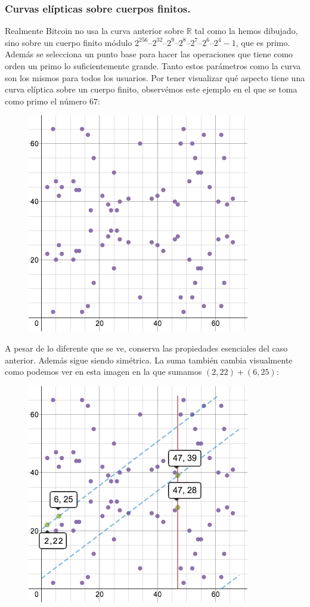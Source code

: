 \documentclass[twoside]{article}
\theoremstyle{definition}
\newcommand{\R}{\mathbb{R}}
\begin{document}
\subsubsection{Curvas elípticas sobre cuerpos finitos.} 
Realmente Bitcoin no usa la curva anterior sobre $\R$ tal como la hemos dibujado, sino sobre un cuerpo finito módulo $2^{256} – 2^{32} – 2^9 – 2^8 – 2^7 – 2^6 – 2^4 - 1$, que es primo. Además se selecciona un punto base para hacer las operaciones que tiene como orden un primo lo suficientemente grande. Tanto estos parámetros como la curva son los mismos para todos los usuarios. Por tener visualizar qué aspecto tiene una curva elíptica sobre un cuerpo finito, observémos este ejemplo en el que se toma como primo el número $67$:
\begin{figure}[h!]
\includegraphics[scale=0.38]{field}
\end{figure}

\newpage

A pesar de lo diferente que se ve, conserva las propiedades esenciales del caso anterior. Además sigue siendo simétrica. La suma también cambia visualmente como podemos ver en esta imagen en la que sumamos $(2,22)+(6,25)$:
\begin{figure}[h!]
\includegraphics[scale=0.45]{sumfield}
\end{figure}
\end{document}

